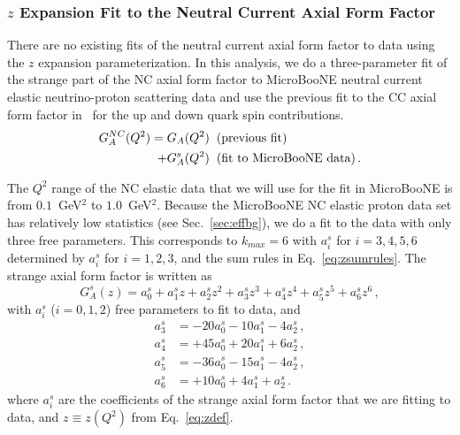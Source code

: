   \subsubsection{$z$ Expansion Fit to the Neutral Current Axial Form Factor}\label{sec:ncaxial}

  There are no existing fits of the neutral current axial form factor to data
  using the $z$ expansion parameterization. In this analysis, we do a
  three-parameter fit of the strange part of the NC axial form factor to
  MicroBooNE neutral current elastic neutrino-proton scattering data and use
  the previous fit to the CC axial form factor in~\cite{Meyer:2016oeg} for the
  up and down quark spin contributions.
  \begin{equation}
    \begin{aligned}
    G_A^{NC}(Q^2) = G_A(Q^2) \hspace{2mm} &(\textrm{previous fit}) \\
                + G_A^s(Q^2) \hspace{2mm} &(\textrm{fit to MicroBooNE data}) \,.
    \end{aligned}
  \end{equation}

  The $Q^2$ range of the NC elastic data that we will use for the fit in
  MicroBooNE is from $0.1$~GeV$^2$ to $1.0$~GeV$^2$.  Because the MicroBooNE NC
  elastic proton data set has relatively low statistics (see
  Sec.~\ref{sec:effbg}), we do a fit to the data with only three free
  parameters. This corresponds to $k_{max} = 6$ with $a_i^s$ for $i=3,4,5,6$
  determined by $a_i^s$ for $i=1,2,3$, and the sum rules in
  Eq.~\ref{eq:zsumrules}. The strange axial form factor is written as
  \begin{equation}
    G_A^s(z) = a_0^s + a_1^s z + a_2^s z^2 
      + a_3^s z^3 + a_4^s z^4 + a_5^s z^5 + a_6^s z^6 \,,
  \end{equation}
  with $a_i^s$ ($i=0,1,2$) free parameters to fit to data, and
  \begin{align}
    a_3^s &= - 20 a_0^s - 10 a_1^s - 4 a_2^s \,,\\
    a_4^s &= + 45 a_0^s + 20 a_1^s + 6 a_2^s \,, \\
    a_5^s &= - 36 a_0^s - 15 a_1^s - 4 a_2^s \,, \\
    a_6^s &= + 10 a_0^s + 4 a_1^s + a_2^s \,.
  \end{align}
  where $a_i^s$ are the coefficients of the strange axial form factor that we
  are fitting to data, and $z \equiv z(Q^2)$ from Eq.~\ref{eq:zdef}.

